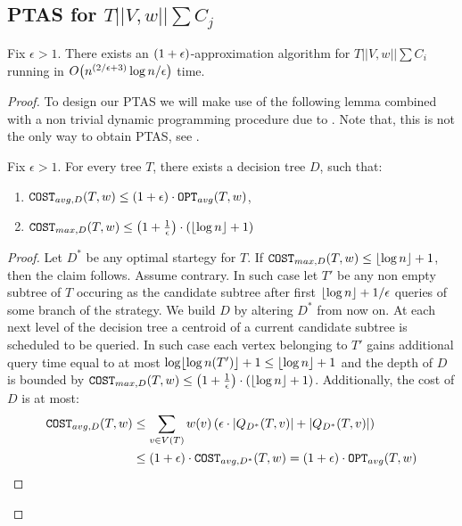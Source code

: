 \subsection{PTAS for $T||V,w||\sum C_j$}
\begin{theorem}
    Fix $\epsilon>1$. There exists an $\mathopen{}\left( 1+\epsilon \right)$-approximation algorithm for $T||V, w||\sum C_i$ running in $O\mathopen{}\left( n^{\mathopen{}\left( 2/\epsilon+3 \right)}\log n/\epsilon \right)$ time.
    \begin{proof}

To design our PTAS we will make use of the following lemma combined with a non trivial dynamic programming procedure due to \cite{Cicalese2014ImprovedApproxAvgTs,Angelidakis2018ShortestPQ, Berendsohn2024}. Note that, this is not the only way to obtain PTAS, see \cite{SplayTonT}.
\begin{lemma}\label{ptas_lemma}
Fix $\epsilon>1$. For every tree $T$, there exists a decision tree $D$, such that:
\begin{enumerate}
    \item $\texttt{COST}_{avg,D}\mathopen{}\left( T,w \right)\leq \mathopen{}\left( 1+\epsilon \right)\cdot\texttt{OPT}_{avg}\mathopen{}\left( T,w \right)$,
    \item $\texttt{COST}_{max,D}\mathopen{}\left( T,w \right)\leq \mathopen{}\left( 1+\frac{1}{\epsilon} \right)\cdot\mathopen{}\left( \mathopen{}\left\lfloor \log n \right\rfloor+1 \right)$
\end{enumerate} 
\begin{proof}
Let $D^*$ be any optimal startegy for $T$. If  $\texttt{COST}_{max,D}\mathopen{}\left( T,w \right)\leq \mathopen{}\left\lfloor \log n \right\rfloor+1$, then the claim follows. Assume contrary. In such case let $T'$ be any non empty subtree of $T$ occuring as the candidate subtree after first ${\mathopen{}\left\lfloor \log n \right\rfloor+1}/{\epsilon}$ queries of some branch of the strategy. We build $D$ by altering $D^*$ from now on. At each next level of the decision tree a centroid of a current candidate subtree is scheduled to be queried. In such case each vertex belonging to $T'$ gains additional query time equal to at most $\log \mathopen{}\left\lfloor \log n\mathopen{}\left( T' \right) \right\rfloor+1\leq \mathopen{}\left\lfloor \log n \right\rfloor+1$ and the depth of $D$ is bounded by $\texttt{COST}_{max,D}\mathopen{}\left( T,w \right)\leq \mathopen{}\left( 1+\frac{1}{\epsilon} \right)\cdot\mathopen{}\left( \mathopen{}\left\lfloor \log n \right\rfloor+1 \right)$. Additionally, the cost of $D$ is at most:
\begin{align*}
    \texttt{COST}_{avg,D}\mathopen{}\left( T,w \right)&\leq 
\sum_{v \in V\mathopen{}\left( T \right)}w\mathopen{}\left( v \right)\mathopen{}\left( \epsilon\cdot \mathopen{}\left| Q_{D^*}\mathopen{}\left( T,v \right) \right|+\mathopen{}\left| Q_{D^*}\mathopen{}\left( T,v \right) \right| \right)
\\&\leq
\mathopen{}\left( 1+\epsilon \right)\cdot \texttt{COST}_{avg,D^*}\mathopen{}\left( T,w \right)=
\mathopen{}\left( 1+\epsilon \right)\cdot\texttt{OPT}_{avg}\mathopen{}\left( T,w \right)
\end{align*}

\end{proof}
\end{lemma}


\end{proof}
\end{theorem}
